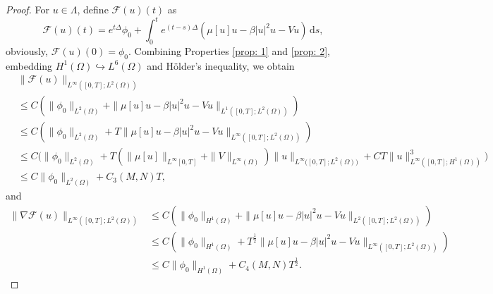 \documentclass{siamart250211}
\def\nn{\nonumber}
\begin{document}
\begin{proof}
For $u \in \Lambda$, define $\mathcal{F}(u)(t)$ as
\begin{equation}
    \mathcal{F}(u)(t)=e^{t\Delta}\phi_0+\int_0^te^{(t-s)\Delta}(\mu[u]u-\beta|u|^{2}u-Vu) \, \text{d}s,
\end{equation}
obviously, $\mathcal{F}(u)(0) = \phi_0$. Combining Properties \ref{prop: 1} and \ref{prop: 2}, embedding $H^1(\Omega)\hookrightarrow L^6(\Omega)$ and H\"older's inequality, we obtain
\begin{align}
    &\|\mathcal{F}(u)\|_{L^\infty([0,T];L^2(\Omega))} \label{f1} \\
    & \le C \left( \|\phi_0\|_{L^2(\Omega)} + \| \mu[u]u-\beta|u|^{2}u-Vu \|_{L^{1}([0,T];L^2(\Omega))} \right) \nn \\
    & \le C \left( \|\phi_0\|_{L^2(\Omega)} + T\| \mu[u]u-\beta|u|^{2}u-Vu \|_{L^{\infty}([0,T];L^2(\Omega))} \right) \nn \\
    & \le C \Big(\|\phi_0\|_{L^2(\Omega)} + T (\|\mu[u]\|_{L^{\infty}[0,T]} + \|V\|_{L^{\infty}(\Omega)})\|u\|_{L^{\infty}\big([0,T];L^2(\Omega)\big)} + CT\|u\|_{L^{\infty}([0,T];H^1(\Omega))}^3  \Big) \nn \\
    & \le C \|\phi_0\|_{L^2(\Omega)} + C_3(M,N)T, \nn
\end{align}
and 
\begin{align}
     \|\nabla \mathcal{F}(u)\|_{L^\infty([0,T];L^2(\Omega))}  &\le C \left( \|\phi_0\|_{H^1(\Omega)} +  \| \mu[u]u-\beta|u|^{2}u-Vu \|_{L^{2}([0,T];L^2(\Omega))} \right) \label{f2} \\
    & \le C \left( \|\phi_0\|_{H^1(\Omega)} + T^{\frac12} \| \mu[u]u-\beta|u|^{2}u-Vu \|_{L^{\infty}([0,T];L^2(\Omega))} \right) \nn \\
    & \le  C \|\phi_0\|_{H^1(\Omega)} + C_4(M,N)T^{\frac12}. \nn
\end{align}
    

\end{proof}
\end{document}
